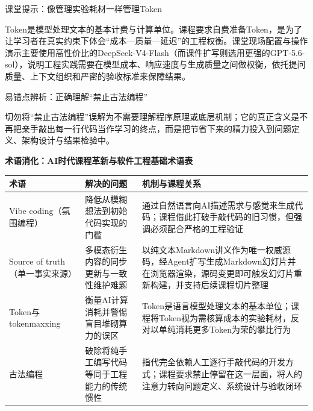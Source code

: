 \documentclass[UTF8,a4paper,11pt,fontset=fandol]{ctexart}
\begin{document}
\begin{knowledgebox}{课堂提示：像管理实验耗材一样管理Token}

Token是模型处理文本的基本计费与计算单位。课程要求自费准备Token，是为了让学习者在真实约束下体会“成本—质量—延迟”的工程权衡。课堂现场配置与操作演示主要使用高性价比的DeepSeek-V4-Flash（而课件扩写则选用更强的GPT-5.6-sol），说明工程实践需要在模型成本、响应速度与生成质量之间做权衡，依托提问质量、上下文组织和严密的验收标准来保障结果。

\end{knowledgebox}

\begin{warningbox}{易错点辨析：正确理解“禁止古法编程”}

切勿将“禁止古法编程”误解为不需要理解程序原理或底层机制；它的真正含义是不再把亲手敲出每一行代码当作学习的终点，而是把节省下来的精力投入到问题定义、架构设计与结果检验中。

\end{warningbox}

\par{}\textbf{术语消化：AI时代课程革新与软件工程基础术语表}

\begin{center}\small\begin{tabularx}{\linewidth}{YYY}

\toprule

术语 & 解决的问题 & 机制与课程关系\\\midrule

Vibe coding（氛围编程） & 降低从模糊想法到初始代码实现的门槛 & 通过自然语言向AI描述需求与感觉来生成代码；课程借此打破手敲代码的旧习惯，但强调必须配合严格的工程验证\\[3pt]

Source of truth（单一事实来源） & 多模态衍生内容的同步更新与一致性维护难题 & 以纯文本Markdown讲义作为唯一权威源码，经Agent扩写生成Markdown幻灯片并在浏览器渲染，源码变更即可触发幻灯片重新构建，并支持后续课程切片整理\\[3pt]

Token与tokenmaxxing & 衡量AI计算消耗并警惕盲目堆砌算力的误区 & Token是语言模型处理文本的基本单位；课程将Token视为需核算成本的实验耗材，反对以单纯消耗更多Token为荣的攀比行为\\[3pt]

古法编程 & 破除将纯手工编写代码等同于工程能力的传统惯性 & 指代完全依赖人工逐行手敲代码的开发方式；课程要求禁止停留在这一层面，将人的注意力转向问题定义、系统设计与验收闭环\\[3pt]

\bottomrule\end{tabularx}\end{center}
\end{document}
